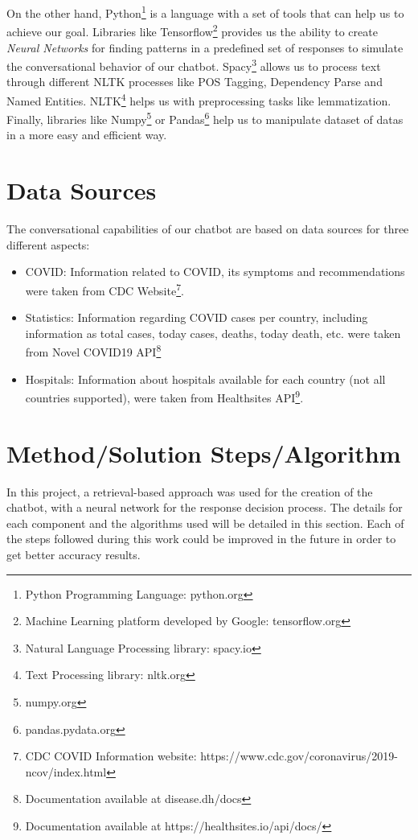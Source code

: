 \documentclass[]{article}
\begin{document}
On the other hand, Python\footnote{Python Programming Language: python.org} is a language with a set of tools that can help us to achieve our goal. Libraries like Tensorflow\footnote{Machine Learning platform developed by Google: tensorflow.org} provides us the ability to create \emph{Neural Networks} for finding patterns in a predefined set of responses to simulate the conversational behavior of our chatbot. Spacy\footnote{Natural Language Processing library: spacy.io} allows us to process text through different NLTK processes like POS Tagging, Dependency Parse and Named Entities. NLTK\footnote{Text Processing library: nltk.org} helps us with preprocessing tasks like lemmatization. Finally, libraries like Numpy\footnote{numpy.org} or Pandas\footnote{pandas.pydata.org} help us to manipulate dataset of datas in a more easy and efficient way.


\section{Data Sources}

The conversational capabilities of our chatbot are based on data sources for three different aspects:

\begin{itemize}
  \item COVID: Information related to COVID, its symptoms and recommendations were taken from CDC Website\footnote{CDC COVID Information website: https://www.cdc.gov/coronavirus/2019-ncov/index.html}.
  \item Statistics: Information regarding COVID cases per country, including information as total cases, today cases, deaths, today death, etc. were taken from Novel COVID19 API\footnote{Documentation available at disease.dh/docs}
  \item Hospitals: Information about hospitals available for each country (not all countries supported), were taken from Healthsites API\footnote{Documentation available at https://healthsites.io/api/docs/}.
\end{itemize}

\section{Method/Solution Steps/Algorithm}

In this project, a retrieval-based approach was used for the creation of the chatbot, with a neural network for the response decision process. The details for each component and the algorithms used will be detailed in this section. Each of the steps followed during this work could be improved in the future in order to get better accuracy results.
\end{document}
